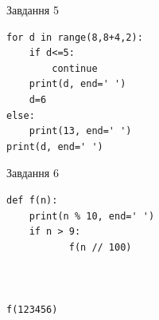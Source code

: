 \documentclass[12pt, ukrainian]{article}
\begin{document}
{\vspace{15mm}
\begin{minipage}[t]{9.7cm}                
{\begin{center}Завдання {5}\end{center}}
\begin{verbatim}
for d in range(8,8+4,2):
    if d<=5:
        continue
    print(d, end=' ')
    d=6
else:
    print(13, end=' ')
print(d, end=' ')
\end{verbatim}     
\end{minipage}
\vline \hspace{8mm}
\begin{minipage}[t]{8.0cm}                
{\begin{center}Завдання {6}\end{center}}
\begin{verbatim}
def f(n):
    print(n % 10, end=' ')
    if n > 9:
           f(n // 100)
    


f(123456)
\end{verbatim}     
\end{minipage}

}
\newpage
\end{document}
